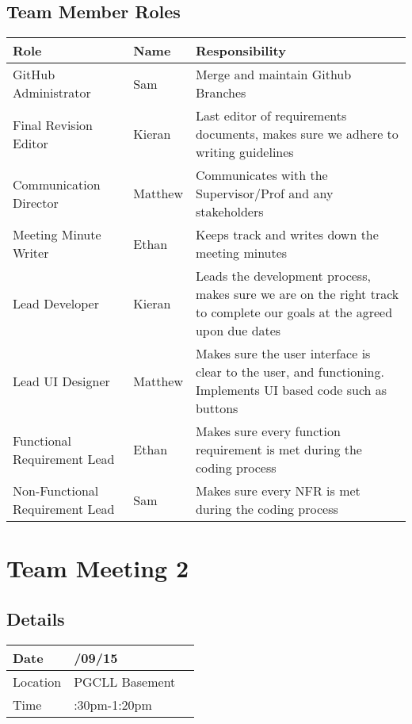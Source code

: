 \documentclass{article}
\begin{document}
\subsection*{Team Member Roles}
\label{sec:roles}

\begin{tabularx}{0.8\textwidth} { 
  | >{\raggedright\arraybackslash}X 
  | >{\centering\arraybackslash}X 
  | >{\raggedleft\arraybackslash}X | }
\hline
  Role & Name & Responsibility\\
\hline
 GitHub Administrator & Sam & Merge and maintain Github Branches \\
\hline
 Final Revision Editor  & Kieran & Last editor of requirements documents, makes sure we adhere to writing guidelines  \\
\hline
Communication Director  & Matthew & Communicates with the Supervisor/Prof and any stakeholders \\
\hline
Meeting Minute Writer & Ethan & Keeps track and writes down the meeting minutes \\
\hline
Lead Developer & Kieran & Leads the development process, makes sure we are on the right track to complete our goals at the agreed upon due dates \\
\hline
Lead UI Designer & Matthew & Makes sure the user interface is clear to the user, and functioning. Implements UI based code such as buttons\\
\hline
Functional Requirement Lead & Ethan & Makes sure every function requirement is met during the coding process\\
\hline
Non-Functional Requirement Lead & Sam & Makes sure every NFR is met during the coding process\\
\hline
\end{tabularx}


\pagebreak
\section*{Team Meeting 2}

\subsection*{Details}

\begin{tabularx}{0.8\textwidth} { 
  | >{\raggedright\arraybackslash}X 
  | >{\centering\arraybackslash}X 
  | >{\raggedleft\arraybackslash}X | }
 \hline
 Date & 2023/09/15  \\
 \hline
 Location  & PGCLL Basement  \\
\hline
Time  & 12:30pm-1:20pm  \\
\hline
\end{tabularx}
\end{document}
